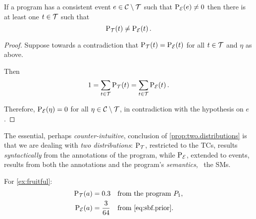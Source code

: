 \documentclass[x11names]{tlp}
\begin{document}
\begin{proposition} \label{prop:two.distributions} %

	If a program has a consistent event $e \in {\mathcal{C}}\setminus{\mathcal{T}}$ such that $\prE\at{e} \not= 0$ then there is at least one $t\in{\mathcal{T}}$ such that
	\begin{equation}
		\prT\at{t} \not= \prE\at{t}. \label{eq:two.distributions}
	\end{equation}

\end{proposition}
\begin{proof}
	Suppose towards a contradiction that $\prT\at{t} = \prE\at{t}$ for
	all $t \in {\mathcal{T}}$ and $\eta$ as above.

	Then
	\begin{equation*}
		1 = \sum_{t \in \TCHOICEset} \prT\at{t}  = \sum_{t \in \TCHOICEset} \prE\at{t}.
	\end{equation*}

	Therefore, $\prE\at{\eta} = 0$ for all $\eta \in {\mathcal{C}}\setminus{\mathcal{T}}$, in contradiction with the hypothesis on $e$.
	\hfill
\end{proof}

The essential, perhaps \emph{counter-intuitive}, conclusion of \cref{prop:two.distributions} is that we are dealing with \emph{two distributions}: $\mathrm{P}_{{\mathcal{T}}}$, restricted to the \aclp{TC}, results \emph{syntactically} from the annotations of the program, while $\mathrm{P}_{{\mathcal{E}}}$, extended to events, results from both the annotations and the program's \emph{semantics}, \ie\ the \aclp{SM}.

For \cref{ex:fruitful}:
\begin{equation*}
	\begin{aligned}
		\prT\at{a} & = 0.3          &  &
		\text{from the program } \SBF, %
		\\
		\prE\at{a} & = \frac{3}{64} &  &
		\text{from \cref{eq:sbf.prior}}.
	\end{aligned}
\end{equation*}
\end{document}
